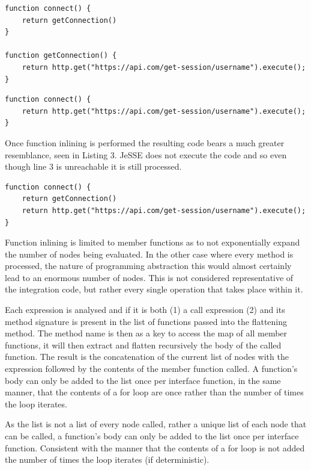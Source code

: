 \documentclass[jou,apacite]{apa6}
\begin{document}
\begin{lstlisting}[caption=Function returning call expression]
function connect() {
	return getConnection()
}

function getConnection() {
	return http.get("https://api.com/get-session/username").execute();
}
\end{lstlisting}

\begin{lstlisting}[caption=Function returning contents of previous call expression]
function connect() {
	return http.get("https://api.com/get-session/username").execute();
}
\end{lstlisting}

Once function inlining is performed the resulting code bears a much greater resemblance, seen in Listing 3. JeSSE does not execute the code and so even though line 3 is unreachable it is still processed.

\begin{lstlisting}[caption=Function returning contents of previous call expression (function inlining of nodes)]
function connect() {
	return getConnection()
	return http.get("https://api.com/get-session/username").execute();
}
\end{lstlisting}

Function inlining is limited to member functions as to not exponentially expand the number of nodes being evaluated. In the other case where every method is processed,  the nature of programming abstraction this would almost certainly lead to an enormous number of nodes. This is not considered representative of the integration code, but rather every single operation that takes place within it. 

Each expression is analysed and if it is both (1) a call expression (2) and its method signature is present in the list of functions passed into the flattening method. The method name is then as a key to access the map of all member functions, it will then extract and flatten recursively the body of the called function. The result is the concatenation of the current list of nodes with the expression followed by the contents of the member function called. A function’s body can only be added to the list once per interface function, in the same manner, that the contents of a for loop are once rather than the number of times the loop iterates. 

As the list is not a list of every node called, rather a unique list of each node that can be called, a function’s body can only be added to the list once per interface function. Consistent with the manner that the contents of a for loop is not added the number of times the loop iterates (if deterministic).
\end{document}
